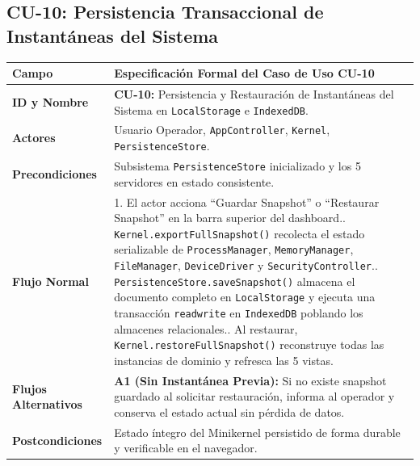 \documentclass[10pt,twocolumn,letterpaper]{article}
\begin{document}
\subsection{CU-10: Persistencia Transaccional de Instant\'aneas del Sistema}
\begin{table}[!htb]
\centering
\scriptsize
\renewcommand{\arraystretch}{1.12}
\begin{tabularx}{\columnwidth}{L{2.1cm} Y}
\toprule
\textbf{Campo} & \textbf{Especificaci\'on Formal del Caso de Uso CU-10} \\
\midrule
\textbf{ID y Nombre} & \textbf{CU-10:} Persistencia y Restauraci\'on de Instant\'aneas del Sistema en \texttt{LocalStorage} e \texttt{IndexedDB}. \\
\textbf{Actores} & Usuario Operador, \texttt{AppController}, \texttt{Kernel}, \texttt{PersistenceStore}. \\
\textbf{Precondiciones} & Subsistema \texttt{PersistenceStore} inicializado y los 5 servidores en estado consistente. \\
\textbf{Flujo Normal} & 1. El actor acciona ``Guardar Snapshot'' o ``Restaurar Snapshot'' en la barra superior del dashboard.. \texttt{Kernel.exportFullSnapshot()} recolecta el estado serializable de \texttt{ProcessManager}, \texttt{MemoryManager}, \texttt{FileManager}, \texttt{DeviceDriver} y \texttt{SecurityController}.. \texttt{PersistenceStore.saveSnapshot()} almacena el documento completo en \texttt{LocalStorage} y ejecuta una transacci\'on \texttt{readwrite} en \texttt{IndexedDB} poblando los almacenes relacionales.. Al restaurar, \texttt{Kernel.restoreFullSnapshot()} reconstruye todas las instancias de dominio y refresca las 5 vistas. \\
\textbf{Flujos Alternativos} & \textbf{A1 (Sin Instant\'anea Previa):} Si no existe snapshot guardado al solicitar restauraci\'on, informa al operador y conserva el estado actual sin p\'erdida de datos. \\
\textbf{Postcondiciones} & Estado \'integro del Minikernel persistido de forma durable y verificable en el navegador. \\
\bottomrule
\end{tabularx}
\end{table}
\end{document}
